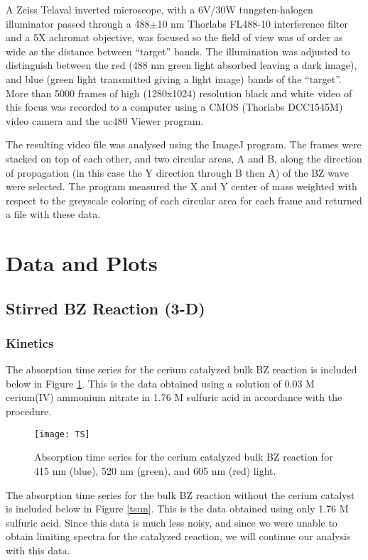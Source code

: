 \documentclass{article}
\begin{document}
A Zeiss Telaval inverted microscope, with a 6V/30W tungsten-halogen illuminator 
passed through a 488$\pm$10  nm Thorlabs FL488-10 interference filter and a 5X achromat
objective, was focused so the field of view was of order as wide as the distance between
``target'' bands. The illumination was adjusted to distinguish between the red (488 nm green 
light absorbed leaving a dark image), and blue (green light transmitted giving a light image) 
bands of the ``target''. More than 5000 frames of high  (1280x1024) resolution  black and 
white video of this focus  was recorded to a computer using a CMOS (Thorlabs DCC1545M) 
video camera and the uc480 Viewer program.

The resulting video file was analysed using the ImageJ program. The frames were stacked
on top of each other, and two circular areas, A and B, along the direction of propagation (in 
this case the Y direction through B then A) of the BZ wave were selected. The program 
measured the X and Y 
center of mass weighted with respect to the greyscale coloring of each circular area for each 
frame and returned a file with these data.

\section{Data and Plots}

\subsection{Stirred BZ Reaction (3-D)}

\subsubsection{Kinetics}

The absorption time series for the cerium catalyzed bulk BZ reaction is included below in 
Figure \ref{tscat}. This is the data obtained using a solution of 0.03 M cerium(IV) ammonium 
nitrate in 1.76 M sulfuric acid in accordance with the procedure.

\begin{figure}[H]
\texttt{[image: TS]}
\centering
\caption{Absorption time series for the cerium catalyzed bulk BZ reaction for 415 nm 
(blue), 520 nm (green), and 605 nm (red) light.}
\label{tscat}
\end{figure}

The absorption time series for the bulk BZ reaction without the cerium catalyst is included 
below in Figure \ref{tsun}. This is the data obtained using only 1.76 M sulfuric acid. Since 
this data is much less noisy, and since we were unable to obtain limiting spectra for the 
catalyzed reaction, we will continue our analysis with this data.
\end{document}

